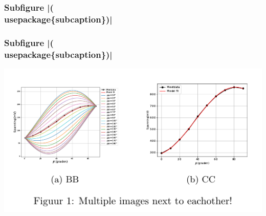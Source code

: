\documentclass[presentatie.tex]{subfiles}
\begin{document}

\begin{frame}
	\frametitle{Subfigure \hll|(\\usepackage\{subcaption\})|}

\end{frame}

\begin{frame}
	\frametitle{Subfigure \hll|(\\usepackage\{subcaption\})|}

	\centering
	\includegraphics[width=\textwidth,height=0.8\textheight,keepaspectratio]{assets/4_Abeeldingen/outdir/subfigure}
\end{frame}
\end{document}
